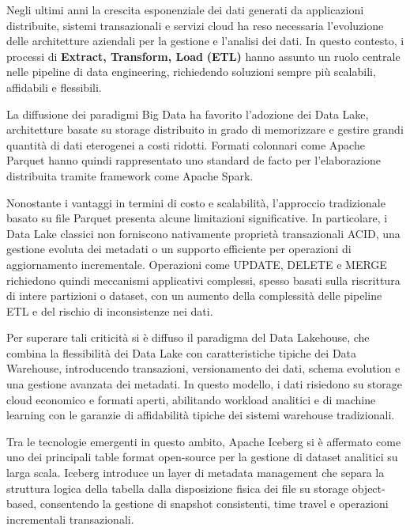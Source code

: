 \documentclass[12pt,a4paper,openright,twoside]{book}
\begin{document}
Negli ultimi anni la crescita esponenziale dei dati generati da applicazioni distribuite, sistemi transazionali e servizi cloud ha reso necessaria l'evoluzione delle architetture aziendali per la gestione e l'analisi dei dati.
In questo contesto, i processi di \textbf{Extract, Transform, Load} \textbf{(ETL)} hanno assunto un ruolo centrale nelle pipeline di data engineering, richiedendo soluzioni sempre più scalabili, affidabili e flessibili.

La diffusione dei paradigmi Big Data ha favorito l'adozione dei Data Lake, architetture basate su storage distribuito in grado di memorizzare e gestire grandi quantità di dati eterogenei a costi ridotti.
Formati colonnari come Apache Parquet hanno quindi rappresentato uno standard de facto per l'elaborazione distribuita tramite framework come Apache Spark.

Nonostante i vantaggi in termini di costo e scalabilità, l'approccio tradizionale basato su file Parquet presenta alcune limitazioni significative.
In particolare, i Data Lake classici non forniscono nativamente proprietà transazionali ACID, una gestione evoluta dei metadati o un supporto efficiente per operazioni di aggiornamento incrementale.
Operazioni come UPDATE, DELETE e MERGE richiedono quindi meccanismi applicativi complessi, spesso basati sulla riscrittura di intere partizioni o dataset, con un aumento della complessità delle pipeline ETL e del rischio di inconsistenze nei dati.

Per superare tali criticità si è diffuso il paradigma del Data Lakehouse, che combina la flessibilità dei Data Lake con caratteristiche tipiche dei Data Warehouse, introducendo transazioni, versionamento dei dati, schema evolution e una gestione avanzata dei metadati.
In questo modello, i dati risiedono su storage cloud economico e formati aperti, abilitando workload analitici e di machine learning con le garanzie di affidabilità tipiche dei sistemi warehouse tradizionali. \cite{armbrust2021lakehouse} \cite{begoli2021lakehouse} \cite{saha2024disruptor}

Tra le tecnologie emergenti in questo ambito, Apache Iceberg si è affermato come uno dei principali table format open-source per la gestione di dataset analitici su larga scala.
Iceberg introduce un layer di metadata management che separa la struttura logica della tabella dalla disposizione fisica dei file su storage object-based, consentendo la gestione di snapshot consistenti, time travel e operazioni incrementali transazionali. \cite{IcebergDocs}
\end{document}

